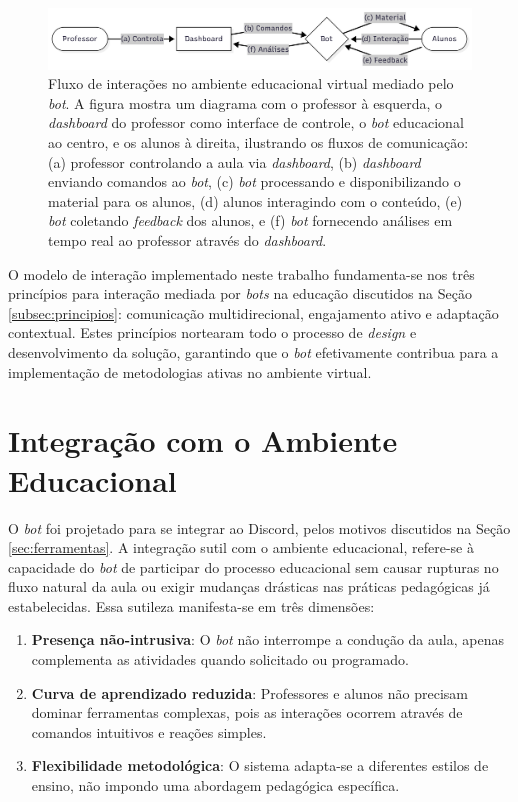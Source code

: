 \begin{figure}[htb]
\centering
\includegraphics[width=16cm]{modelo-interacao.png}
\caption{Fluxo de interações no ambiente educacional virtual mediado pelo
\textit{bot}. A figura mostra um diagrama com o professor à esquerda, o
\textit{dashboard} do professor como interface de controle, o \textit{bot}
educacional ao centro, e os alunos à direita, ilustrando os fluxos de
comunicação: (a) professor controlando a aula via \textit{dashboard}, (b)
\textit{dashboard} enviando comandos ao \textit{bot}, (c) \textit{bot} 
processando e disponibilizando o material para os alunos, (d) alunos interagindo
com o conteúdo, (e) \textit{bot} coletando \textit{feedback} dos alunos, e (f)
\textit{bot} fornecendo análises em tempo real ao professor através do
\textit{dashboard}.} 
\label{fig:modelo-interacao}
\end{figure}

O modelo de interação implementado neste trabalho fundamenta-se nos três
princípios para interação mediada por \textit{bots} na educação discutidos na
Seção \ref{subsec:principios}: comunicação multidirecional, engajamento ativo e
adaptação contextual. Estes princípios nortearam todo o processo de
\textit{design} e desenvolvimento da solução, garantindo que o \textit{bot}
efetivamente contribua para a implementação de metodologias ativas no ambiente
virtual.

\section{Integração com o Ambiente Educacional}
\label{sec:integracao}

O \textit{bot} foi projetado para se integrar ao Discord, pelos motivos
discutidos na Seção \ref{sec:ferramentas}. A integração sutil com o ambiente
educacional, refere-se à capacidade do \textit{bot} de participar do processo
educacional sem causar rupturas no fluxo natural da aula ou exigir mudanças
drásticas nas práticas pedagógicas já estabelecidas. Essa sutileza manifesta-se
em três dimensões:

\begin{enumerate}
\item \textbf{Presença não-intrusiva}: O \textit{bot} não interrompe a condução
da aula, apenas complementa as atividades quando solicitado ou programado.
\item \textbf{Curva de aprendizado reduzida}: Professores e alunos não precisam
dominar ferramentas complexas, pois as interações ocorrem através de comandos
intuitivos e reações simples.
\item \textbf{Flexibilidade metodológica}: O sistema adapta-se a diferentes
estilos de ensino, não impondo uma abordagem pedagógica específica.
\end{enumerate}

